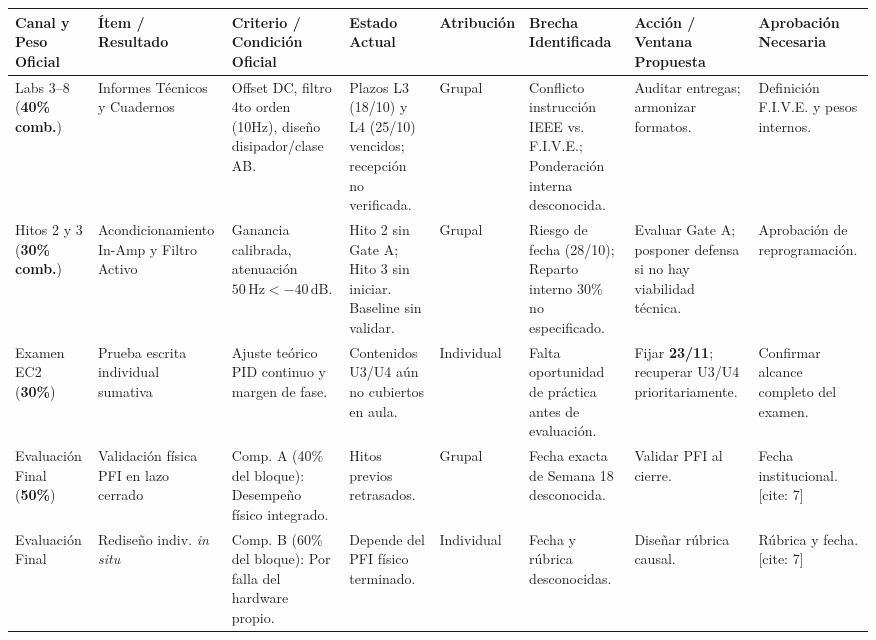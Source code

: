 \documentclass[10pt, a4paper, landscape]{article}
\begin{document}
\vspace{-0.2cm}
\begin{table}[htbp]
    \centering
    \scriptsize
    \renewcommand{\arraystretch}{1.3}
    \begin{tabularx}{\textwidth}{|P{1.8cm}|P{2.3cm}|P{2.8cm}|P{2.6cm}|P{1.8cm}|P{3.0cm}|P{3.0cm}|Y|}
    \hline
    \textbf{Canal y Peso Oficial} & \textbf{Ítem / Resultado} & \textbf{Criterio / Condición Oficial} & \textbf{Estado Actual} & \textbf{Atribución} & \textbf{Brecha Identificada} & \textbf{Acción / Ventana Propuesta} & \textbf{Aprobación Necesaria} \\ \hline
    Labs 3--8 (\textbf{40\% comb.}) & Informes Técnicos y Cuadernos & Offset DC, filtro 4to orden (10Hz), diseño disipador/clase AB. & Plazos L3 (18/10) y L4 (25/10) vencidos; recepción no verificada. & Grupal & Conflicto instrucción IEEE vs. F.I.V.E.; Ponderación interna desconocida. & Auditar entregas; armonizar formatos. & Definición F.I.V.E. y pesos internos. \\ \hline
    Hitos 2 y 3 (\textbf{30\% comb.}) & Acondicionamiento In-Amp y Filtro Activo & Ganancia calibrada, atenuación $50\,\text{Hz} < -40\,\text{dB}$. & Hito 2 sin Gate A; Hito 3 sin iniciar. Baseline sin validar. & Grupal & Riesgo de fecha (28/10); Reparto interno 30\% no especificado. & Evaluar Gate A; posponer defensa si no hay viabilidad técnica. & Aprobación de reprogramación. \\ \hline
    Examen EC2 (\textbf{30\%}) & Prueba escrita individual sumativa & Ajuste teórico PID continuo y margen de fase. & Contenidos U3/U4 aún no cubiertos en aula. & Individual & Falta oportunidad de práctica antes de evaluación. & Fijar \textbf{23/11}; recuperar U3/U4 prioritariamente. & Confirmar alcance completo del examen. \\ \hline
    Evaluación Final (\textbf{50\%}) & Validación física PFI en lazo cerrado & Comp. A (40\% del bloque): Desempeño físico integrado. & Hitos previos retrasados. & Grupal & Fecha exacta de Semana 18 desconocida. & Validar PFI al cierre. & Fecha institucional.[cite: 7] \\ \hline
    Evaluación Final & Rediseño indiv. \textit{in situ} & Comp. B (60\% del bloque): Por falla del hardware propio. & Depende del PFI físico terminado. & Individual & Fecha y rúbrica desconocidas. & Diseñar rúbrica causal. & Rúbrica y fecha.[cite: 7] \\ \hline
    \end{tabularx}
\end{table}
\end{document}
